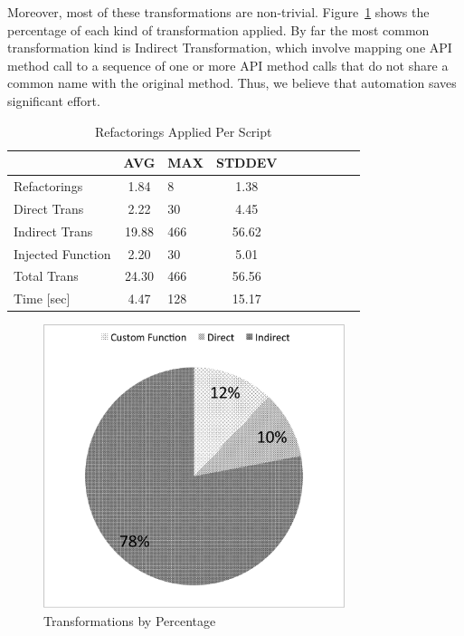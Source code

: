 \documentclass[preprint]{sigplanconf}
\begin{document}
Moreover, most of these transformations are non-trivial. Figure~\ref{fig:transformations_pieChart} shows the percentage of each kind of transformation applied. By far the most common transformation kind is Indirect Transformation, which involve mapping one API method call to a sequence of one or more API method calls that do not share a common name with the original method. Thus, we believe that automation saves significant effort.
\begin{table}[htdp]
\begin{center}
\begin{tabular}{lclclclclc|}

 & AVG & MAX & STDDEV \\
\hline
\hline
Refactorings & 1.84 & 8 & 1.38 \\
\hline
Direct Trans & 2.22 & 30 & 4.45 \\
\hline
Indirect Trans & 19.88  & 466 & 56.62\\
\hline
Injected Function & 2.20 & 30 & 5.01 \\
\hline
Total Trans & 24.30 & 466 & 56.56 \\
\hline 
Time [sec] & 4.47 & 128 & 15.17\\


\end{tabular}
\nocaptionrule
\caption{Refactorings Applied Per Script}
\label{table:avgTrans}
\end{center}
\end{table}%

\begin{figure}[htbp!]
\begin{center}
\includegraphics[width=250pt]{images/TransformationsChart}
\nocaptionrule
\caption{Transformations by Percentage}
\label{fig:transformations_pieChart}
\end{center}
\end{figure}
\end{document}

